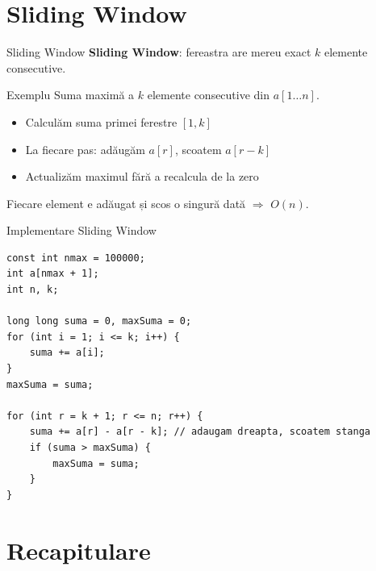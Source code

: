 \documentclass{beamer}
\begin{document}
\section{Sliding Window}

\begin{frame}{Sliding Window}
  \textbf{Sliding Window}: fereastra are mereu exact $k$ elemente consecutive.

  \begin{block}{Exemplu}
    Suma maximă a $k$ elemente consecutive din $a[1 \ldots n]$.
  \end{block}

  \begin{itemize}
    \item Calculăm suma primei ferestre $[1, k]$
    \item La fiecare pas: adăugăm $a[r]$, scoatem $a[r-k]$
    \item Actualizăm maximul \textemdash{} fără a recalcula de la zero
  \end{itemize}

  \smallskip
  Fiecare element e adăugat și scos o singură dată $\Rightarrow$ $O(n)$.
\end{frame}

\begin{frame}{Implementare \textemdash{} Sliding Window}
  \begin{lstlisting}
const int nmax = 100000;
int a[nmax + 1];
int n, k;

long long suma = 0, maxSuma = 0;
for (int i = 1; i <= k; i++) {
    suma += a[i];
}
maxSuma = suma;

for (int r = k + 1; r <= n; r++) {
    suma += a[r] - a[r - k]; // adaugam dreapta, scoatem stanga
    if (suma > maxSuma) {
        maxSuma = suma;
    }
}
  \end{lstlisting}
\end{frame}

\section{Recapitulare}
\end{document}

